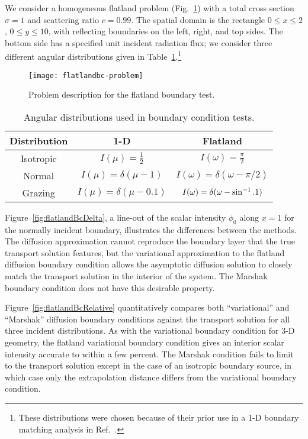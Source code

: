 We consider a homogeneous flatland problem (Fig.~\ref{fig:flatlandBcProblem})
with a
total cross section $\sigma=1$ and scattering ratio $c=0.99$. The spatial 
domain is the rectangle $0 \le x \le 2$, $0 \le y \le 10$, with
reflecting boundaries on the left,
right, and top sides. The bottom side has a specified unit incident radiation
flux; we consider three different angular
distributions given in Table~\ref{tab:angularDistributions}.\footnote{These
distributions were chosen because of their prior use in a 1-D boundary
matching analysis in Ref.~\cite{Dav2006}.}

\begin{figure}[htb]
  \centering
  \texttt{[image: flatlandbc-problem]}
  \caption{Problem description for the flatland boundary test.}
  \label{fig:flatlandBcProblem}
\end{figure}

\begin{table}[htb]
  \centering
  \begin{tabular}{ccc}
\toprule
    Distribution & 1-D & Flatland
\\ \midrule
Isotropic & $I(\mu) = \frac{1}{2}$ & $I(\omega) = \frac{\pi}{2}$
\\
Normal & $I(\mu) = \delta(\mu-1)$ & $I(\omega) = \delta(\omega-\pi/2)$
\\
Grazing & $I(\mu) = \delta(\mu-0.1)$ & $I(\omega) = \delta(\omega-\sin^{-1}.1)$
\\ \bottomrule
  \end{tabular}
  \caption{Angular distributions used in boundary condition tests.}
  \label{tab:angularDistributions}
\end{table}

Figure~\ref{fig:flatlandBcDelta},
 a line-out of the scalar intensity $\phi_0$ along
$x=1$ for the normally incident boundary, illustrates the differences between
the methods. The diffusion
approximation cannot reproduce the boundary layer that the true transport
solution features, but the variational approximation to the flatland
diffusion boundary condition allows the asymptotic diffusion solution to
closely match the transport solution in the interior of the system. The Marshak
boundary condition does not have this desirable property.

Figure~\ref{fig:flatlandBcRelative} quantitatively compares both ``variational'' and
``Marshak'' diffusion boundary conditions against the transport solution
for all three incident distributions.  
As with the variational boundary condition for 3-D geometry, the flatland
variational boundary condition gives an interior scalar intensity accurate to within
a few percent. The Marshak condition fails to limit to the transport solution except in
the case of an isotropic boundary source, in which case only the extrapolation
distance differs from the variational boundary condition.

